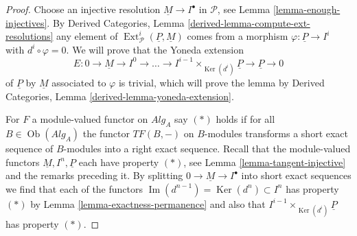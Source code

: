 \documentclass{stacks-project}
\theoremstyle{plain}
\theoremstyle{definition}
\theoremstyle{remark}
\numberwithin{equation}{subsection}
\def\Ext{\mathop{\mathrm{Ext}}\nolimits}
\def\Ob{\mathop{\mathrm{Ob}}\nolimits}
\def\Ker{\mathop{\mathrm{Ker}}}
\def\Im{\mathop{\mathrm{Im}}}
\begin{document}
\begin{proof}
Choose an injective resolution $\underline{M} \to I^\bullet$ in
$\mathcal{P}$, see
Lemma \ref{lemma-enough-injectives}.
By
Derived Categories, Lemma \ref{derived-lemma-compute-ext-resolutions}
any element of $\Ext^i_\mathcal{P}(\underline{P}, \underline{M})$
comes from a morphism $\varphi : \underline{P} \to I^i$ with
$d^i \circ \varphi = 0$. We will prove that the
Yoneda extension
$$
E : 0 \to \underline{M} \to I^0 \to \ldots \to
I^{i - 1} \times_{\Ker(d^i)} \underline{P} \to \underline{P} \to 0
$$
of $\underline{P}$ by $\underline{M}$
associated to $\varphi$ is trivial, which will prove the lemma by
Derived Categories, Lemma \ref{derived-lemma-yoneda-extension}.

\medskip\noindent
For $F$ a module-valued functor on $\textit{Alg}_A$
say $(*)$ holds if for all $B \in \Ob(\textit{Alg}_A)$ the
functor $TF(B, -)$ on $B$-modules transforms a short exact sequence
of $B$-modules into a right exact sequence.
Recall that the module-valued functors $\underline{M}, I^n, \underline{P}$
each have property $(*)$, see
Lemma \ref{lemma-tangent-injective}
and the remarks preceding it.
By splitting $0 \to \underline{M} \to I^\bullet$ into short
exact sequences we find that each of the functors
$\Im(d^{n - 1}) = \Ker(d^n) \subset I^n$ has property $(*)$ by
Lemma \ref{lemma-exactness-permanence}
and also that $I^{i - 1} \times_{\Ker(d^i)} \underline{P}$ has property
$(*)$.


\end{proof}
\end{document}
